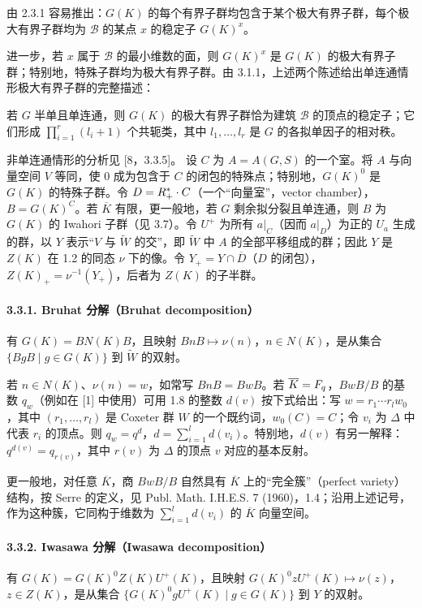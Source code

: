 由 2.3.1 容易推出：$G(K)$ 的每个有界子群均包含于某个极大有界子群，每个极大有界子群均为 $\mathscr B$ 的某点 $x$ 的稳定子 $G(K)^x$。

进一步，若 $x$ 属于 $\mathscr B$ 的最小维数的面，则 $G(K)^x$ 是 $G(K)$ 的极大有界子群；特别地，特殊子群均为极大有界子群。由 3.1.1，上述两个陈述给出单连通情形极大有界子群的完整描述：

若 $G$ 半单且单连通，则 $G(K)$ 的极大有界子群恰为建筑 $\mathscr B$ 的顶点的稳定子；它们形成 $\prod_{i=1}^r(l_i+1)$ 个共轭类，其中 $l_1,\ldots,l_r$ 是 $G$ 的各拟单因子的相对秩。

非单连通情形的分析见 [8，3.3.5]。
设 $C$ 为 $A=A(G,S)$ 的一个室。将 $A$ 与向量空间 $V$ 等同，使 $0$ 成为包含于 $C$ 的闭包的特殊点；特别地，$G(K)^0$ 是 $G(K)$ 的特殊子群。令 $D=R_+^*\cdot C$（一个“向量室”，vector chamber），$B=G(K)^C$。若 $\overline K$ 有限，更一般地，若 $G$ 剩余拟分裂且单连通，则 $B$ 为 $G(K)$ 的 Iwahori 子群（见 3.7）。令 $U^+$ 为所有 $a|_C$（因而 $a|_D$）为正的 $U_a$ 生成的群，以 $Y$ 表示“$V$ 与 $\widetilde W$ 的交”，即 $\widetilde W$ 中 $A$ 的全部平移组成的群；因此 $Y$ 是 $Z(K)$ 在 1.2 的同态 $\nu$ 下的像。令 $Y_+=Y\cap\overline D$（$D$ 的闭包），$Z(K)_+=\nu^{-1}(Y_+)$，后者为 $Z(K)$ 的子半群。

\paragraph*{3.3.1. Bruhat 分解（Bruhat decomposition）}有 $G(K)=BN(K)B$，且映射 $BnB\mapsto\nu(n)$，$n\in N(K)$，是从集合 $\{BgB\mid g\in G(K)\}$ 到 $\widetilde W$ 的双射。

若 $n\in N(K)$、$\nu(n)=w$，如常写 $BnB=BwB$。若 $\overline K=F_q$，$BwB/B$ 的基数 $q_w$（例如在 [1] 中使用）可用 1.8 的整数 $d(v)$ 按下式给出：写 $w=r_1\cdots r_lw_0$，其中 $(r_1,\ldots,r_l)$ 是 Coxeter 群 $W$ 的一个既约词，$w_0(C)=C$；令 $v_i$ 为 $\Delta$ 中代表 $r_i$ 的顶点。则 $q_w=q^d$，$d=\sum_{i=1}^ld(v_i)$。特别地，$d(v)$ 有另一解释：$q^{d(v)}=q_{r(v)}$，其中 $r(v)$ 为 $\Delta$ 的顶点 $v$ 对应的基本反射。

更一般地，对任意 $\overline K$，商 $BwB/B$ 自然具有 $\overline K$ 上的“完全簇”（perfect variety）结构，按 Serre 的定义，见 Publ. Math. I.H.E.S. 7 (1960)，1.4；沿用上述记号，作为这种簇，它同构于维数为 $\sum_{i=1}^ld(v_i)$ 的 $\overline K$ 向量空间。

\paragraph*{3.3.2. Iwasawa 分解（Iwasawa decomposition）}有 $G(K)=G(K)^0Z(K)U^+(K)$，且映射 $G(K)^0zU^+(K)\mapsto\nu(z)$，$z\in Z(K)$，是从集合 $\{G(K)^0gU^+(K)\mid g\in G(K)\}$ 到 $Y$ 的双射。

